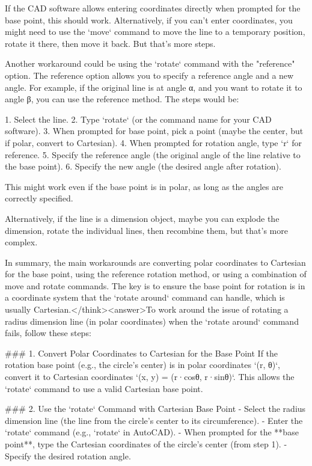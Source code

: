 If the CAD software allows entering coordinates directly when prompted for the base point, this should work. Alternatively, if you can't enter coordinates, you might need to use the `move` command to move the line to a temporary position, rotate it there, then move it back. But that's more steps. 

Another workaround could be using the `rotate` command with the "reference" option. The reference option allows you to specify a reference angle and a new angle. For example, if the original line is at angle α, and you want to rotate it to angle β, you can use the reference method. The steps would be:

1. Select the line.
2. Type `rotate` (or the command name for your CAD software).
3. When prompted for base point, pick a point (maybe the center, but if polar, convert to Cartesian).
4. When prompted for rotation angle, type `r` for reference.
5. Specify the reference angle (the original angle of the line relative to the base point).
6. Specify the new angle (the desired angle after rotation).

This might work even if the base point is in polar, as long as the angles are correctly specified. 

Alternatively, if the line is a dimension object, maybe you can explode the dimension, rotate the individual lines, then recombine them, but that's more complex. 

In summary, the main workarounds are converting polar coordinates to Cartesian for the base point, using the reference rotation method, or using a combination of move and rotate commands. The key is to ensure the base point for rotation is in a coordinate system that the `rotate around` command can handle, which is usually Cartesian.</think><answer>To work around the issue of rotating a radius dimension line (in polar coordinates) when the `rotate around` command fails, follow these steps:  

### 1. Convert Polar Coordinates to Cartesian for the Base Point  
If the rotation base point (e.g., the circle’s center) is in polar coordinates `(r, θ)`, convert it to Cartesian coordinates `(x, y) = (r·cosθ, r·sinθ)`. This allows the `rotate` command to use a valid Cartesian base point.  

### 2. Use the `rotate` Command with Cartesian Base Point  
- Select the radius dimension line (the line from the circle’s center to its circumference).  
- Enter the `rotate` command (e.g., `rotate` in AutoCAD).  
- When prompted for the **base point**, type the Cartesian coordinates of the circle’s center (from step 1).  
- Specify the desired rotation angle.  

